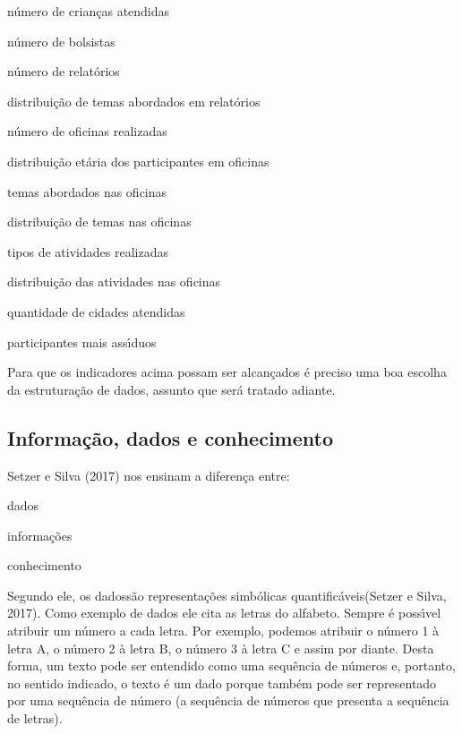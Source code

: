 \documentclass[
12pt,		%
openright,	%
twoside,  %
a4paper,			%
chapter=TITLE,		%
english,			%
french,				%
spanish,			%
brazil				%
]{USPSC-classe/USPSC_RedarTex}
\begin{document}
\begin{alineas}
\item n\'umero de crian\c{c}as atendidas
\item n\'umero de bolsistas
\item n\'umero de relat\'orios
\item distribui\c{c}\~ao de temas abordados em relat\'orios
\item n\'umero de oficinas realizadas
\item distribui\c{c}\~ao et\'aria dos participantes em oficinas
\item temas abordados nas oficinas
\item distribui\c{c}\~ao de temas nas oficinas
\item tipos de atividades realizadas
\item distribui\c{c}\~ao das atividades nas oficinas
\item quantidade de cidades atendidas
\item participantes mais ass\'{\i}duos
\end{alineas}

Para que os indicadores acima possam ser alcan\c{c}ados \'e preciso uma boa escolha da estrutura\c{c}\~ao de dados, assunto que ser\'a tratado adiante.








\subsection[Informa\c{c}\~ao, dados e conhecimento]{Informa\c{c}\~ao, dados e conhecimento}\label{Informa\c{c}\~ao, dados e conhecimento}
 Setzer e Silva (2017)  nos ensinam a diferen\c{c}a entre:









\begin{alineas}
\item dados
\item informa\c{c}\~oes
\item conhecimento
\end{alineas}

Segundo ele, os \textquotedbl dados\textquotedbl  s\~ao \textquotedbl representa\c{c}\~oes simb\'olicas quantific\'aveis\textquotedbl   (Setzer e Silva, 2017). Como exemplo de dados ele cita as letras do alfabeto. Sempre \'e poss\'{\i}vel atribuir um n\'umero a cada letra. Por exemplo, podemos atribuir o n\'umero 1 \`a letra A, o n\'umero 2 \`a letra B, o n\'umero 3 \`a letra C e assim por diante. Desta forma, um texto pode ser entendido como uma sequ\^encia de n\'umeros e, portanto, no sentido indicado, o texto \'e um dado porque tamb\'em pode ser representado por uma sequ\^encia de n\'umero (a sequ\^encia de n\'umeros que presenta a sequ\^encia de letras).
\end{document}
